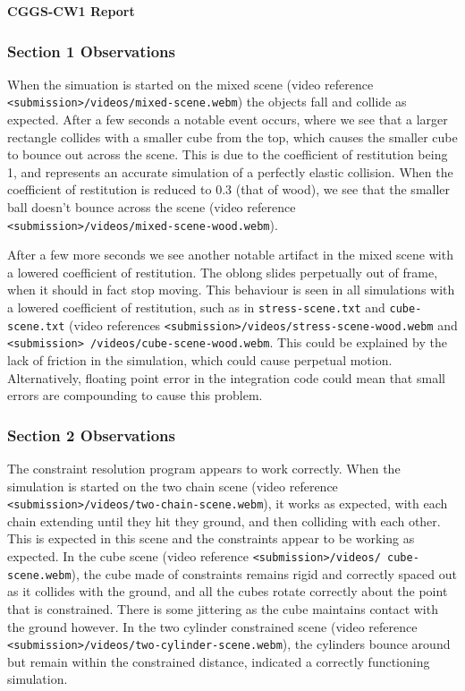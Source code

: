 \documentclass[11pt,a4paper]{article}
\begin{document}
 

{\Large \textbf{CGGS-CW1 Report}}\\
\indent {}

\subsubsection*{Section 1 Observations}

When the simuation is started on the mixed scene (video reference \texttt{<submission>/videos/mixed-scene.webm}) the objects fall and collide as expected. 
After a few seconds a notable event occurs, where we see that a larger rectangle collides with a smaller cube from the top, which causes the smaller cube to bounce out across the scene. 
This is due to the coefficient of restitution being 1, and represents an accurate simulation of a perfectly elastic collision. 
When the coefficient of restitution is reduced to 0.3 (that of wood), we see that the smaller ball doesn't bounce across the scene (video reference \texttt{<submission>/videos/mixed-scene-wood.webm}).

After a few more seconds we see another notable artifact in the mixed scene with a lowered coefficient of restitution. 
The oblong slides perpetually out of frame, when it should in fact stop moving. 
This behaviour is seen in all simulations with a lowered coefficient of restitution, such as in \texttt{stress-scene.txt} and \texttt{cube-scene.txt} (video references \texttt{<submission>/videos/stress-scene-wood.webm} and \texttt{<submission> /videos/cube-scene-wood.webm}. 
This could be explained by the lack of friction in the simulation, which could cause perpetual motion. 
Alternatively, floating point error in the integration code could mean that small errors are compounding to cause this problem. 

\subsubsection*{Section 2 Observations}

The constraint resolution program appears to work correctly.
When the simulation is started on the two chain scene (video reference \texttt{<submission>/videos/two-chain-scene.webm}), it works as expected, with each chain extending until they hit they ground, and then colliding with each other.
This is expected in this scene and the constraints appear to be working as expected. 
In the cube scene (video reference \texttt{<submission>/videos/ cube-scene.webm}), the cube made of constraints remains rigid and correctly spaced out as it collides with the ground, and all the cubes rotate correctly about the point that is constrained. 
There is some jittering as the cube maintains contact with the ground however.
In the two cylinder constrained scene (video reference \texttt{<submission>/videos/two-cylinder-scene.webm}), the cylinders bounce around but remain within the constrained distance, indicated a correctly functioning simulation.
\end{document}

